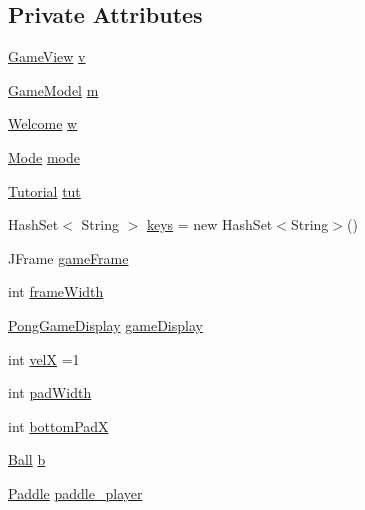 \subsection*{Private Attributes}
\begin{DoxyCompactItemize}
\item 
\hyperlink{classview_1_1_game_view}{Game\+View} \hyperlink{classstart_game_1_1_game_controller_a86e3c6ba6e8d0ecb0946da48fa55e7ee}{v}
\item 
\hyperlink{classmodel_1_1_game_model}{Game\+Model} \hyperlink{classstart_game_1_1_game_controller_a2c79234f85f979b8f1efe5a48893560d}{m}
\item 
\hyperlink{classview_1_1_welcome}{Welcome} \hyperlink{classstart_game_1_1_game_controller_a5478c83b51a049015f9d4d6bc5c61607}{w}
\item 
\hyperlink{classview_1_1_mode}{Mode} \hyperlink{classstart_game_1_1_game_controller_ad46f15cbc3846c80495ca340b3b1dedc}{mode}
\item 
\hyperlink{classview_1_1_tutorial}{Tutorial} \hyperlink{classstart_game_1_1_game_controller_ae807267b0bf97687ef3c7d57e815414e}{tut}
\item 
Hash\+Set$<$ String $>$ \hyperlink{classstart_game_1_1_game_controller_afed267a642ca7f3ec1c1074fec2996dd}{keys} = new Hash\+Set$<$String$>$()
\item 
J\+Frame \hyperlink{classstart_game_1_1_game_controller_adc48b19833b682baaa2e189362db5456}{game\+Frame}
\item 
int \hyperlink{classstart_game_1_1_game_controller_a1f16d94b3e5246eb723f9ca04aad4735}{frame\+Width}
\item 
\hyperlink{classview_1_1_pong_game_display}{Pong\+Game\+Display} \hyperlink{classstart_game_1_1_game_controller_aca62497a42166cbb72f5eafbc270afde}{game\+Display}
\item 
int \hyperlink{classstart_game_1_1_game_controller_a9de0dcbec624980f8b3808daa96ef457}{velX} =1
\item 
int \hyperlink{classstart_game_1_1_game_controller_a27e5857e2a63e94e92410f8794064db9}{pad\+Width}
\item 
int \hyperlink{classstart_game_1_1_game_controller_a9969047b4b184c3ea25eeb4ef52dfb1e}{bottom\+PadX}
\item 
\hyperlink{classmodel_1_1_ball}{Ball} \hyperlink{classstart_game_1_1_game_controller_a402855c8c84c77218045cc997a784693}{b}
\item 
\hyperlink{classmodel_1_1_paddle}{Paddle} \hyperlink{classstart_game_1_1_game_controller_a4dc3f50458dc835c6fa67be53fd1751b}{paddle\+\_\+player}

\end{DoxyCompactItemize}
